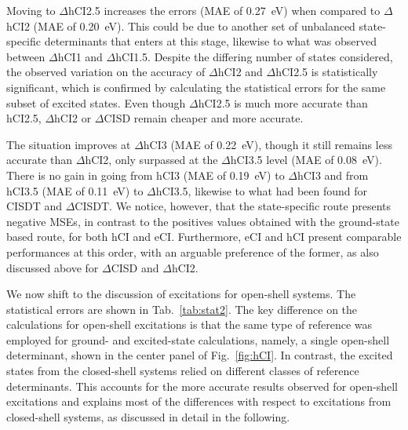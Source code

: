 \documentclass[aip,jcp,reprint,noshowkeys,superscriptaddress]{revtex4-1}
\begin{document}
Moving to $\Delta$hCI2.5 increases the errors (MAE of \SI{0.27}{\eV}) when compared to $\Delta$hCI2 (MAE of \SI{0.20}{\eV}).
This could be due to another set of unbalanced state-specific determinants that enters at this stage, likewise to what was observed between $\Delta$hCI1 and $\Delta$hCI1.5.
Despite the differing number of states considered, the observed variation on the accuracy of $\Delta$hCI2 and $\Delta$hCI2.5 is statistically significant,
which is confirmed by calculating the statistical errors for the same subset of excited states.
Even though $\Delta$hCI2.5 is much more accurate than hCI2.5, $\Delta$hCI2 or $\Delta$CISD remain cheaper and more accurate.

The situation improves at $\Delta$hCI3 (MAE of \SI{0.22}{\eV}), though it still remains less accurate than $\Delta$hCI2,
only surpassed at the $\Delta$hCI3.5 level (MAE of \SI{0.08}{\eV}).
There is no gain in going from hCI3 (MAE of \SI{0.19}{\eV}) to $\Delta$hCI3 and from hCI3.5 (MAE of \SI{0.11}{\eV}) to $\Delta$hCI3.5,
likewise to what had been found for CISDT and $\Delta$CISDT. \cite{Kossoski_2023}
We notice, however, that the state-specific route presents negative MSEs, in contrast to the positives values obtained with the ground-state based route, for both hCI and eCI.
Furthermore, eCI and hCI present comparable performances at this order, with an arguable preference of the former,
as also discussed above for $\Delta$CISD and $\Delta$hCI2.

We now shift to the discussion of excitations for open-shell systems.
The statistical errors are shown in Tab.~\ref{tab:stat2}.
The key difference on the calculations for open-shell excitations is that the same type of reference was employed for ground- and excited-state calculations, namely,
a single open-shell determinant, shown in the center panel of Fig.~\ref{fig:hCI}.
In contrast, the excited states from the closed-shell systems relied on different classes of reference determinants.
This accounts for the more accurate results observed for open-shell excitations and explains most of the differences with respect to excitations from closed-shell systems, as discussed in detail in the following.
\end{document}
